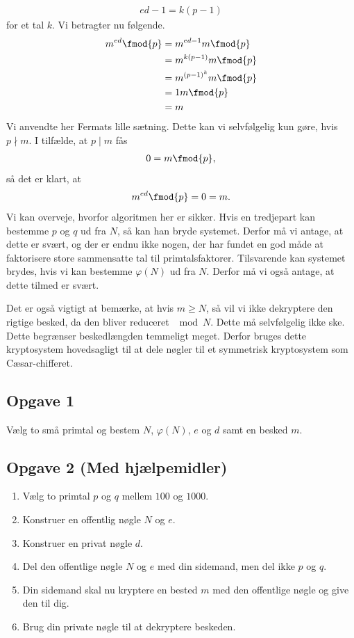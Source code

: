 \begin{align*}
	ed - 1 = k(p-1)
\end{align*} 
for et tal $k$. Vi betragter nu følgende.
\begin{align*}
	m^{ed} \fmod{p} &= m^{ed - 1}m \fmod{p}\\
	&=m^{k(p-1)}m \fmod{p}\\
	&=m^{(p-1)^k} m\fmod{p}\\
	&= 1m\fmod{p}\\
	&=m
\end{align*}
Vi anvendte her Fermats lille sætning. Dette kan vi selvfølgelig kun gøre, hvis $p \nmid m$. I tilfælde, at $p \mid m$ fås
\begin{align*}
	0 = m \fmod{p},
\end{align*}
så det er klart, at 
\begin{align*}
	m^{ed} \fmod{p} = 0 = m.
\end{align*}
Vi kan overveje, hvorfor algoritmen her er sikker. Hvis en tredjepart kan bestemme $p$ og $q$ ud fra $N$, så kan han bryde systemet. Derfor må vi antage, at dette er svært, og der er endnu ikke nogen, der har fundet en god måde at faktorisere store sammensatte tal til primtalsfaktorer. Tilsvarende kan systemet brydes, hvis vi kan bestemme $\varphi(N)$ ud fra $N$. Derfor må vi også antage, at dette tilmed er svært. 

Det er også vigtigt at bemærke, at hvis $m\geq N$, så vil vi ikke dekryptere den rigtige besked, da den bliver reduceret $\mod{N}$. Dette må selvfølgelig ikke ske. Dette begrænser beskedlængden temmeligt meget. Derfor bruges dette kryptosystem hovedsagligt til at dele nøgler til et symmetrisk kryptosystem som Cæsar-chifferet.

\subsection*{Opgave 1}

Vælg to små primtal og bestem $N$, $\varphi(N)$, $e$ og $d$ samt en besked $m$. 

\subsection*{Opgave 2 (Med hjælpemidler)}

\begin{enumerate}[label=\roman*)]
	\item Vælg to primtal $p$ og $q$ mellem $100$ og $1000$. 
	\item Konstruer en offentlig nøgle $N$ og $e$.
	\item Konstruer en privat nøgle $d$.
	\item Del den offentlige nøgle $N$ og $e$ med din sidemand, men del ikke $p$ og $q$.
	\item Din sidemand skal nu kryptere en bested $m$ med den offentlige nøgle og give den til dig. 
	\item Brug din private nøgle til at dekryptere beskeden. 
\end{enumerate}